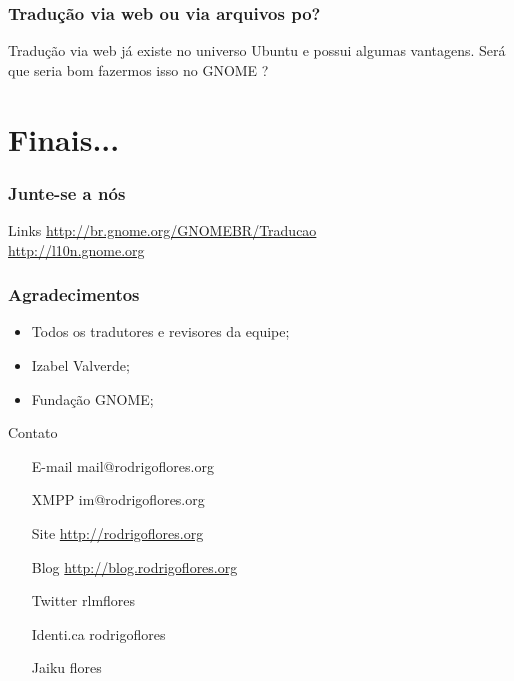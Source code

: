 \documentclass{beamer}
\begin{document}
\begin{frame}
    \frametitle{Tradução via web ou via arquivos po?}
    Tradução via web já existe no universo Ubuntu e possui algumas vantagens. Será que seria bom
    fazermos isso no GNOME ?
\end{frame}


\section{Finais...}

\begin{frame}
  \frametitle{Junte-se a nós}
 
  \begin{block}{Links}
     \url{http://br.gnome.org/GNOMEBR/Traducao}\\
     \url{http://l10n.gnome.org}
  \end{block}
\end{frame}


\begin{frame}
  \frametitle{Agradecimentos}

  \begin{itemize}[<+->]
    \item Todos os tradutores e revisores da equipe;
    \item Izabel Valverde;
    \item Fundação GNOME;     
  \end{itemize}
\end{frame}

\begin{frame}
    \begin{block}{Contato}     
    \begin{itemize}
            \centering
            \item[E-mail] mail@rodrigoflores.org 
            \item[XMPP]  im@rodrigoflores.org        
            \item[Site]  \url{http://rodrigoflores.org}
            \item[Blog]  \url{http://blog.rodrigoflores.org}        
            \item[Twitter] rlmflores 
            \item[Identi.ca] rodrigoflores        
            \item[Jaiku] flores        
        \end{itemize}
    \end{block}
\end{frame}
\end{document}
